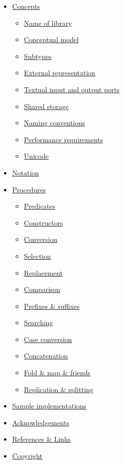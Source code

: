 \begin{itemize}
\tightlist
\item
  \protect\hyperlink{Specification}{Concepts}

  \begin{itemize}
  \tightlist
  \item
    \protect\hyperlink{LibraryName}{Name of library}
  \item
    \protect\hyperlink{ConceptualModel}{Conceptual model}
  \item
    \protect\hyperlink{Subtypes}{Subtypes}
  \item
    \protect\hyperlink{ExternalRepresentation}{External representation}
  \item
    \protect\hyperlink{TextualPorts}{Textual input and output ports}
  \item
    \protect\hyperlink{SharedStorage}{Shared storage}
  \item
    \protect\hyperlink{NamingConventions}{Naming conventions}
  \item
    \protect\hyperlink{PerformanceRequirements}{Performance
    requirements}
  \item
    \protect\hyperlink{Unicode}{Unicode}
  \end{itemize}
\item
  \protect\hyperlink{Notation}{Notation}
\item
  \protect\hyperlink{Procedures}{Procedures}

  \begin{itemize}
  \tightlist
  \item
    \protect\hyperlink{Predicates}{Predicates}
  \item
    \protect\hyperlink{Constructors}{Constructors}
  \item
    \protect\hyperlink{Conversion}{Conversion}
  \item
    \protect\hyperlink{Selection}{Selection}
  \item
    \protect\hyperlink{Replacement}{Replacement}
  \item
    \protect\hyperlink{Comparison}{Comparison}
  \item
    \protect\hyperlink{PrefixesSuffixes}{Prefixes \& suffixes}
  \item
    \protect\hyperlink{Searching}{Searching}
  \item
    \protect\hyperlink{CaseConversion}{Case conversion}
  \item
    \protect\hyperlink{Concatenation}{Concatenation}
  \item
    \protect\hyperlink{FoldMap}{Fold \& map \& friends}
  \item
    \protect\hyperlink{ReplicationSplitting}{Replication \& splitting}
  \end{itemize}
\item
  \protect\hyperlink{SampleImp}{Sample implementations}
\item
  \protect\hyperlink{Acknowledgements}{Acknowledgements}
\item
  \protect\hyperlink{Links}{References \& Links}
\item
  \protect\hyperlink{Copyright}{Copyright}
\end{itemize}

